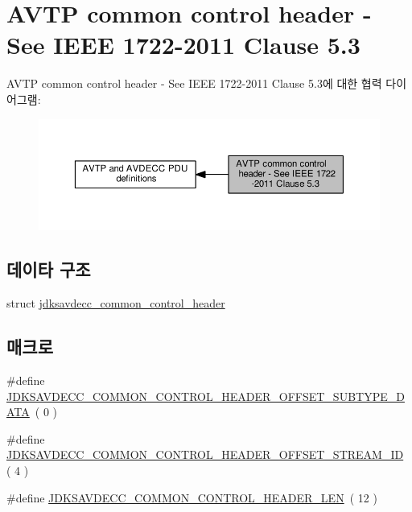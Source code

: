 \hypertarget{group__jdksavdecc__avtp__common__control__header}{}\section{A\+V\+TP common control header -\/ See I\+E\+EE 1722-\/2011 Clause 5.3}
\label{group__jdksavdecc__avtp__common__control__header}
A\+V\+TP common control header -\/ See I\+E\+EE 1722-\/2011 Clause 5.3에 대한 협력 다이어그램\+:
\nopagebreak
\begin{figure}[H]
\begin{center}
\leavevmode
\includegraphics[width=350pt]{group__jdksavdecc__avtp__common__control__header}
\end{center}
\end{figure}
\subsection*{데이타 구조}
\begin{DoxyCompactItemize}
\item 
struct \hyperlink{structjdksavdecc__common__control__header}{jdksavdecc\+\_\+common\+\_\+control\+\_\+header}
\end{DoxyCompactItemize}
\subsection*{매크로}
\begin{DoxyCompactItemize}
\item 
\#define \hyperlink{group__jdksavdecc__avtp__common__control__header_gac313a4689ca11d5326801a9c3be240fd}{J\+D\+K\+S\+A\+V\+D\+E\+C\+C\+\_\+\+C\+O\+M\+M\+O\+N\+\_\+\+C\+O\+N\+T\+R\+O\+L\+\_\+\+H\+E\+A\+D\+E\+R\+\_\+\+O\+F\+F\+S\+E\+T\+\_\+\+S\+U\+B\+T\+Y\+P\+E\+\_\+\+D\+A\+TA}~( 0 )
\item 
\#define \hyperlink{group__jdksavdecc__avtp__common__control__header_ga74d94705d74110c7a4fbc7c3d70dfc63}{J\+D\+K\+S\+A\+V\+D\+E\+C\+C\+\_\+\+C\+O\+M\+M\+O\+N\+\_\+\+C\+O\+N\+T\+R\+O\+L\+\_\+\+H\+E\+A\+D\+E\+R\+\_\+\+O\+F\+F\+S\+E\+T\+\_\+\+S\+T\+R\+E\+A\+M\+\_\+\+ID}~( 4 )
\item 
\#define \hyperlink{group__jdksavdecc__avtp__common__control__header_gaae84052886fb1bb42f3bc5f85b741dff}{J\+D\+K\+S\+A\+V\+D\+E\+C\+C\+\_\+\+C\+O\+M\+M\+O\+N\+\_\+\+C\+O\+N\+T\+R\+O\+L\+\_\+\+H\+E\+A\+D\+E\+R\+\_\+\+L\+EN}~( 12 )
\end{DoxyCompactItemize}
